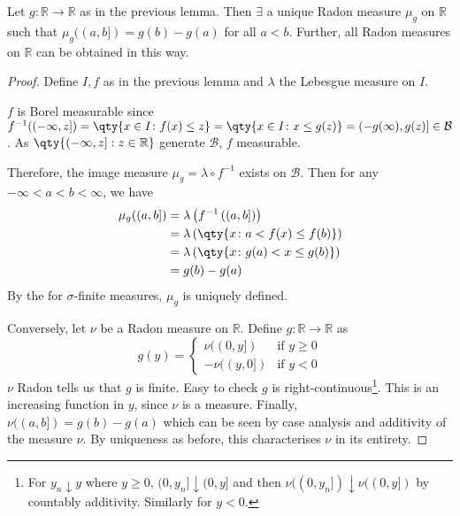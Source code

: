 \begin{theorem}
	Let $g \colon \mathbb R \to \mathbb R$ as in the previous lemma.
	Then $\exists$ a unique Radon measure $\mu_g$ on $\mathbb R$ such that $\mu_g((a,b]) = g(b) - g(a)$ for all $a < b$.
	Further, all Radon measures on $\mathbb{R}$ can be obtained in this way.
\end{theorem}

\begin{proof}
	Define $I, f$ as in the previous lemma and $\lambda$ the Lebesgue measure on $I$.

	$f$ is Borel measurable since $f^{-1}((-\infty,z]) = \qty{x \in I \colon f(x) \leq z} = \qty{x \in I \colon x \leq g(z)} = (-g(\infty),g(z)] \in \mathcal{B}$. As $\qty{(-\infty,z] : z \in \mathbb{R}}$ generate $\mathcal{B}$, $f$ measurable.

	Therefore, the image measure $\mu_g = \lambda \circ f^{-1}$ exists on $\mathcal{B}$.
	Then for any $-\infty < a < b < \infty$, we have
	\begin{align*}
		\mu_g((a,b]) &= \lambda \left( f^{-1}\left( (a,b] \right) \right) \\
		&= \lambda \left( \qty{x \colon a < f(x) \leq f(b)} \right) \\
		&= \lambda \left( \qty{x \colon g(a) < x \leq g(b)} \right) \\
		&= g(b) - g(a)
	\end{align*}
	By the  for $\sigma$-finite measures, $\mu_g$ is uniquely defined.

	Conversely, let $\nu$ be a Radon measure on $\mathbb R$.
	Define $g : \mathbb{R} \to \mathbb{R}$ as
	\[ g(y) = \begin{cases}
		\nu((0,y]) & \text{if } y \geq 0 \\
		-\nu((y,0]) & \text{if } y < 0
	\end{cases} \]
	$\nu$ Radon tells us that $g$ is finite.
	Easy to check $g$ is right-continuous\footnote{For $y_n \downarrow y$ where $y \geq 0$, $(0, y_n] \downarrow (0, y]$ and then $\nu((0, y_n]) \downarrow \nu((0, y])$ by countably additivity. Similarly for $y < 0$.}.
	This is an increasing function in $y$, since $\nu$ is a measure.
	Finally, $\nu((a,b]) = g(b) - g(a)$ which can be seen by case analysis and additivity of the measure $\nu$.
	By uniqueness as before, this characterises $\nu$ in its entirety.
\end{proof}

